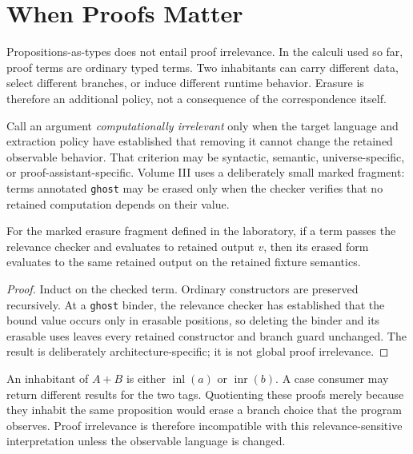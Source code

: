 \chapter{When Proofs Matter}
\label{ch:relevance}

Propositions-as-types does not entail proof irrelevance. In the calculi used so far, proof terms are ordinary typed terms. Two inhabitants can carry different data, select different branches, or induce different runtime behavior. Erasure is therefore an additional policy, not a consequence of the correspondence itself.



Call an argument \emph{computationally irrelevant} only when the target language and extraction policy have established that removing it cannot change the retained observable behavior. That criterion may be syntactic, semantic, universe-specific, or proof-assistant-specific. Volume III uses a deliberately small marked fragment: terms annotated \texttt{ghost} may be erased only when the checker verifies that no retained computation depends on their value.

\begin{proposition}
For the marked erasure fragment defined in the laboratory, if a term passes the relevance checker and evaluates to retained output $v$, then its erased form evaluates to the same retained output on the retained fixture semantics.
\end{proposition}
\begin{proof}
Induct on the checked term. Ordinary constructors are preserved recursively. At a \texttt{ghost} binder, the relevance checker has established that the bound value occurs only in erasable positions, so deleting the binder and its erasable uses leaves every retained constructor and branch guard unchanged. The result is deliberately architecture-specific; it is not global proof irrelevance.
\end{proof}



\begin{workedexample}[title={Two inhabitants can compute differently}]
An inhabitant of $A+B$ is either $\operatorname{inl}(a)$ or $\operatorname{inr}(b)$. A case consumer may return different results for the two tags. Quotienting these proofs merely because they inhabit the same proposition would erase a branch choice that the program observes. Proof irrelevance is therefore incompatible with this relevance-sensitive interpretation unless the observable language is changed.
\end{workedexample}

